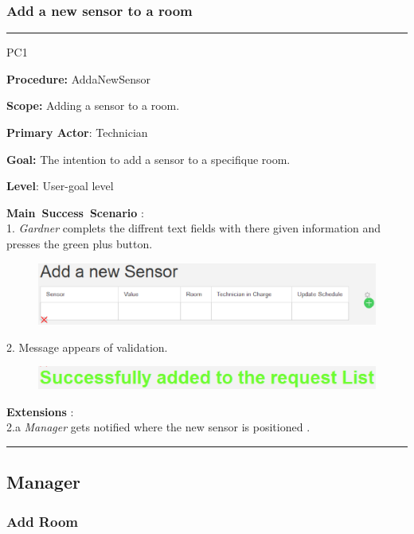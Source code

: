\subsubsection{Add a new sensor to a room}
\vspace{0.5cm}
\hrule
\hfill \break
\begin{lyxlist}{PC1}
\small{
\item [\textbf{Procedure:}] AddaNewSensor
\item [\textbf{Scope:}] Adding a sensor to a room.
\item [\textbf{Primary Actor}:] Technician
\item [\textbf{Goal:}] The intention to add a sensor to a specifique room.
\item [\textbf{Level}:] User-goal level
\item [\textbf{Main~Success~Scenario}]:\\
1. \emph{Gardner} complets the diffrent text fields with there given
information and presses the green plus button. 

 \begin{figure}
\includegraphics[width=1\textwidth]{images/AddANewSensor.eps}
\end{figure} 
2. Message appears of validation.
 \begin{figure}
\includegraphics[width=1\textwidth]{images/RequestAddANewSensor.eps}
\end{figure}
\item [\textbf{Extensions}]:\\
2.a  \emph{Manager} gets notified where the new sensor is positioned .\\
}
\end{lyxlist}
\hrule
\vspace{0.5cm}




\subsection{Manager}
\subsubsection{Add Room}

